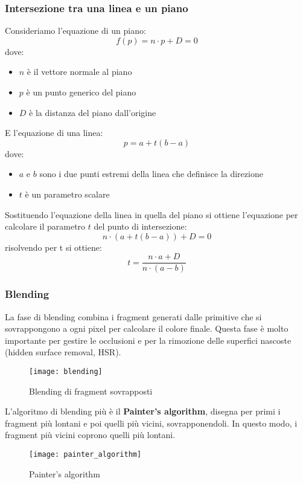 \documentclass[a4paper]{article}
\begin{document}
\subsubsection{Intersezione tra una linea e un piano}
Consideriamo l'equazione di un piano:
\[
  f(p) = n \cdot p + D = 0
\] 
dove:
\begin{itemize}
  \item \( n \) è il vettore normale al piano
  \item \( p \) è un punto generico del piano
  \item \( D \) è la distanza del piano dall'origine
\end{itemize}
E l'equazione di una linea:
\[
  p = a + t(b - a)
\] 
dove:
\begin{itemize}
  \item \( a \) e \( b \) sono i due punti estremi della linea che definisce la direzione
  \item \( t \) è un parametro scalare
\end{itemize}
Sostituendo l'equazione della linea in quella del piano si ottiene l'equazione per
calcolare il parametro \( t \) del punto di intersezione:
\[
  n \cdot \left( a + t \left( b-a \right)  \right) + D = 0
\] 
risolvendo per t si ottiene:
\[
  t = \frac{n \cdot a+D}{n \cdot (a-b)}
\] 

\subsubsection{Blending}
La fase di blending combina i fragment generati dalle primitive che si sovrappongono
a ogni pixel per calcolare il colore finale. Questa fase è molto importante per gestire
le occlusioni e per la rimozione delle superfici nascoste (hidden surface removal, HSR).
\begin{figure}[H]
  \centering
  \texttt{[image: blending]}
  \caption{Blending di fragment sovrapposti}
\end{figure}

\vspace{1em}
\noindent
L'algoritmo di blending più è il \textbf{Painter's algorithm}, disegna per primi i fragment
più lontani e poi quelli più vicini, sovrapponendoli. In questo modo, i fragment più vicini
coprono quelli più lontani.
\begin{figure}[H]
  \centering
  \texttt{[image: painter\_algorithm]}
  \caption{Painter's algorithm}
\end{figure}
\end{document}
